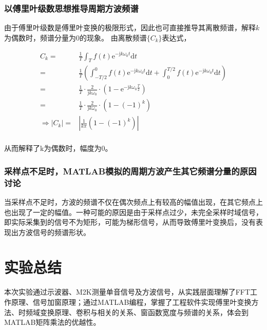 \documentclass[12pt]{article}
\begin{document}
\subsubsection{以傅里叶级数思想推导周期方波频谱}
由于傅里叶级数是傅里叶变换的极限形式，因此也可直接推导其离散频谱，解释$k$为偶数时，频谱分量为0的现象。
由离散频谱$\{C_k\}$表达式，
\begin{center}
           {\setlength\abovedisplayskip{-0.4cm}
           \begin{equation}
               \begin{aligned}
                C_k = &\frac{1}{T}\int_T f(t) \mathrm{e}^{-\mathrm{j}k\omega_0t}\mathrm{d}t\\
                = & \frac{1}{T}(\int_{-T/2}^0f(t)\mathrm{e}^{-\mathrm{j}k\omega_0t}\mathrm{d}t + \int_{0}^{T/2}f(t)\mathrm{e}^{-\mathrm{j}k\omega_0t}\mathrm{d}t)\\
                =&\frac{1}{T}\cdot \frac{2}{\mathrm{j}k\omega_0}\cdot(1-\mathrm{e}^{-\mathrm{j}k\omega_0 \frac{T}{2}})\\
                =&\frac{1}{T}\cdot \frac{2}{\mathrm{j}k\omega_0}\cdot (1-(-1)^k)\\
                 \Rightarrow |C_k|=&|\frac{1}{k\pi}(1-(-1)^k)|\\        
               \end{aligned}
           \end{equation}
           }
           \label{equ_fourier2}
\end{center}
从而解释了k为偶数时，幅度为0。

\subsubsection{采样点不足时，MATLAB模拟的周期方波产生其它频谱分量的原因讨论}
当采样点不足时，方波的频谱不仅在偶次频点上有较高的幅值出现，在其它频点上也出现了一定的幅值。一种可能的原因是由于采样点过少，未完全采样时域信号，即实际采集到的信号不为矩形，可能为梯形信号，从而导致傅里叶变换后，没有表现出方波信号的频谱形状。



\section{实验总结}
本次实验通过示波器、M2K测量单音信号及方波信号，从实践层面理解了FFT工作原理、信号加窗原理；通过MATLAB编程，掌握了工程软件实现傅里叶变换方法、时频域变换原理、卷积与相关的关系、窗函数宽度与频谱的关系，体会到MATLAB矩阵乘法的优越性。
\end{document}
